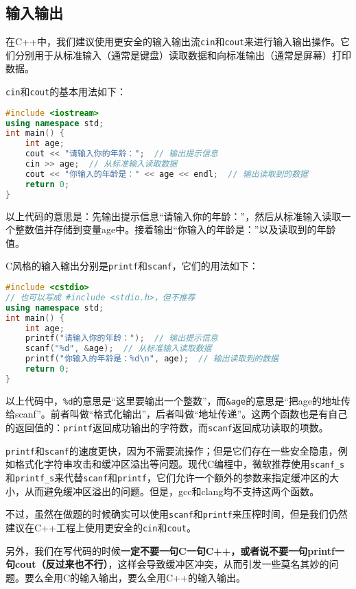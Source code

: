 \subsection{输入输出}

在C++中，我们建议使用更安全的输入输出流\texttt{cin}和\texttt{cout}来进行输入输出操作。它们分别用于从标准输入（通常是键盘）读取数据和向标准输出（通常是屏幕）打印数据。

\texttt{cin}和\texttt{cout}的基本用法如下：
\begin{lstlisting}[language=C++]
#include <iostream>
using namespace std;
int main() {
    int age;
    cout << "请输入你的年龄：";  // 输出提示信息
    cin >> age;  // 从标准输入读取数据
    cout << "你输入的年龄是：" << age << endl;  // 输出读取到的数据
    return 0;
}
\end{lstlisting}
以上代码的意思是：先输出提示信息“请输入你的年龄：”，然后从标准输入读取一个整数值并存储到变量age中。接着输出“你输入的年龄是：”以及读取到的年龄值。

C风格的输入输出分别是\texttt{printf}和\texttt{scanf}，它们的用法如下：
\begin{lstlisting}[language=C++]
#include <cstdio>
// 也可以写成 #include <stdio.h>，但不推荐
using namespace std;
int main() {
    int age;
    printf("请输入你的年龄：");  // 输出提示信息
    scanf("%d", &age);  // 从标准输入读取数据
    printf("你输入的年龄是：%d\n", age);  // 输出读取到的数据
    return 0;
}
\end{lstlisting}
以上代码中，\texttt{\%d}的意思是“这里要输出一个整数”，而\texttt{\&age}的意思是“把age的地址传给scanf”。前者叫做“格式化输出”，后者叫做“地址传递”。这两个函数也是有自己的返回值的：\texttt{printf}返回成功输出的字符数，而\texttt{scanf}返回成功读取的项数。

\texttt{printf}和\texttt{scanf}的速度更快，因为不需要流操作；但是它们存在一些安全隐患，例如格式化字符串攻击和缓冲区溢出等问题。现代C编程中，微软推荐使用\texttt{scanf\_s}和\texttt{printf\_s}来代替\texttt{scanf}和\texttt{printf}，它们允许一个额外的参数来指定缓冲区的大小，从而避免缓冲区溢出的问题。但是，gcc和clang均不支持这两个函数。

不过，虽然在做题的时候确实可以使用\texttt{scanf}和\texttt{printf}来压榨时间，但是我们仍然建议在C++工程上使用更安全的\texttt{cin}和\texttt{cout}。

另外，我们在写代码的时候{\color{red}\textbf{一定不要一句C一句C++，或者说不要一句printf一句cout（反过来也不行）}}，这样会导致缓冲区冲突，从而引发一些莫名其妙的问题。要么全用C的输入输出，要么全用C++的输入输出。

